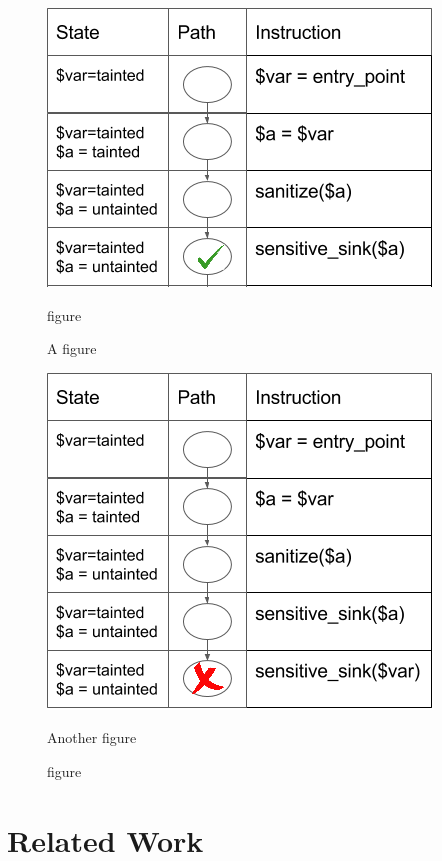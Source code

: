\documentclass{./llncs2e/llncs}
\begin{document}
\begin{figure}
	\centering
	\begin{minipage}{.5\textwidth}
		\centering
		\includegraphics[width=.5\linewidth]{right.png}
		\caption{figure}{A figure}
		\label{fig:right}
	\end{minipage}%
	\begin{minipage}{.5\textwidth}
		\centering
		\includegraphics[width=.5\linewidth]{wrong.png}
		\caption{figure}{Another figure}
		\label{fig:wrong}
	\end{minipage}
\end{figure}

\section{Related Work}

%
%


\end{document}
